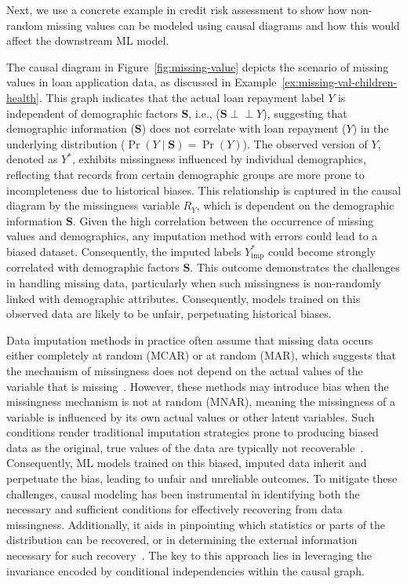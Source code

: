 \documentclass[11pt]{article}
\newcommand{\indep}{\mbox{$\perp\!\!\!\perp$}}
\begin{document}
Next, we use a concrete example in credit risk assessment to show how non-random missing values can be modeled using causal diagrams and how this would affect the downstream ML model. 
\vspace{-.1cm}
\begin{example}\label{ex:causal-missing-val-children-health}  
   The causal diagram in Figure~\ref{fig:missing-value} depicts the scenario of missing values in loan application data, as discussed in Example~\ref{ex:missing-val-children-health}. This graph indicates that the actual loan repayment label \( Y \) is independent of demographic factors \( \boldsymbol{S} \), i.e., (\( \boldsymbol{S} \indep Y \)), suggesting that demographic information (\( \boldsymbol{S} \)) does not correlate with loan repayment (\( Y \)) in the underlying distribution (\( \Pr(Y \mid \boldsymbol{S}) = \Pr(Y) \)). The observed version of \( Y \), denoted as \( Y^* \), exhibits missingness influenced by individual demographics, reflecting that records from certain demographic groups are more prone to incompleteness due to historical biases. This relationship is captured in the causal diagram by the missingness variable \( R_Y \), which is dependent on the demographic information \( \boldsymbol{S} \). 
   Given the high correlation between the occurrence of missing values and demographics, any imputation method with errors could lead to a biased dataset. Consequently, the imputed labels \( Y^*_{\text{imp}} \) could become strongly correlated with demographic factors \( \boldsymbol{S} \). This outcome demonstrates the challenges in handling missing data, particularly when such missingness is non-randomly linked with demographic attributes. Consequently, models trained on this observed data are likely to be unfair, perpetuating historical biases.

\end{example}


Data imputation methods in practice often assume that missing data occurs either completely at random (MCAR) or at random (MAR), which suggests that the mechanism of missingness does not depend on the actual values of the variable that is missing~\cite{graham2012missing}. However, these methods may introduce bias when the missingness mechanism is not at random (MNAR), meaning the missingness of a variable is influenced by its own actual values or other latent variables. Such conditions render traditional imputation strategies prone to producing biased data as the original, true values of the data are typically not recoverable~\cite{guo2023sufficient,graham2012missing,pearl2013recoverability,lee2012recovery}. Consequently, ML models trained on this biased, imputed data inherit and perpetuate the bias, leading to unfair and unreliable outcomes. To mitigate these challenges, causal modeling has been instrumental in identifying both the necessary and sufficient conditions for effectively recovering from data missingness. Additionally, it aids in pinpointing which statistics or parts of the distribution can be recovered, or in determining the external information necessary for such recovery~\cite{mohan2021graphical}. The key to this approach lies in leveraging the invariance encoded by conditional independencies within the causal graph.
\end{document}
